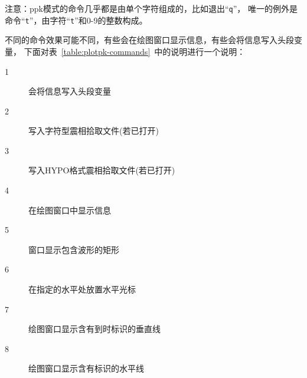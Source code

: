 注意：ppk模式的命令几乎都是由单个字符组成的，比如退出``\verb+q+''，
唯一的例外是命令``\verb+t+''，由字符``\verb+t+''和0-9的整数构成。

不同的命令效果可能不同，有些会在绘图窗口显示信息，有些会将信息写入头段变量，
下面对表~\ref{table:plotpk-commands}~中的说明进行一个说明：
\begin{description}
    \item [1] 会将信息写入头段变量
    \item [2] 写入字符型震相拾取文件(若已打开)
    \item [3] 写入HYPO格式震相拾取文件(若已打开)
    \item [4] 在绘图窗口中显示信息
    \item [5] 窗口显示包含波形的矩形
    \item [6] 在指定的水平处放置水平光标
    \item [7] 绘图窗口显示含有到时标识的垂直线
    \item [8] 绘图窗口显示含有标识的水平线
\end{description}

